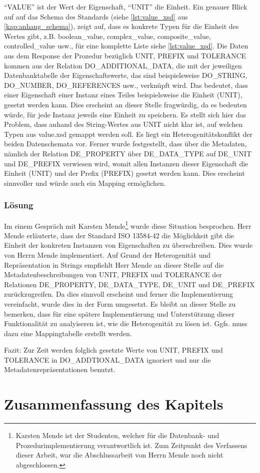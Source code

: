 \enquote{VALUE} ist der Wert der Eigenschaft, \enquote{UNIT} die Einheit. Ein genauer Blick auf auf das Schema des Standards (siehe \autoref{lst:value_xsd} aus \autoref{kap:anhang_schema}), zeigt auf, dass es konkrete Typen für die Einheit des Wertes gibt, z.B. boolean\_value, complex\_value, composite\_value, controlled\_value usw., für eine komplette Liste siehe \autoref{lst:value_xsd}. 
Die Daten aus dem Response der Prozedur bezüglich UNIT, PREFIX und TOLERANCE kommen aus der Relation DO\_ADDITIONAL\_DATA, die mit der jeweiligen Datenbanktabelle der Eigenschaftswerte, das sind beispielsweise DO\_STRING, DO\_NUMBER, DO\_REFERENCES usw., verknüpft wird. Das bedeutet, dass einer Eigenschaft einer Instanz eines Teiles beispielsweise die Einheit (UNIT), gesetzt werden kann. Dies erscheint an dieser Stelle fragwürdig, da es bedeuten würde, für jede Instanz jeweils eine Einheit zu speichern. 
Es stellt sich hier das Problem, dass anhand des String-Wertes aus UNIT nicht klar ist, auf welchen Typen aus value.xsd gemappt werden soll. Es liegt ein Heterogenitätskonflikt der beiden Datenschemata vor.  
Ferner wurde festgestellt, dass über die Metadaten, nämlich der Relation DE\_PROPERTY über DE\_DATA\_TYPE auf DE\_UNIT und DE\_PREFIX verwiesen wird, womit allen Instanzen dieser Eigenschaft die Einheit (UNIT) und der Prefix (PREFIX) gesetzt werden kann. Dies erscheint sinnvoller und würde auch ein Mapping ermöglichen. 

\subsubsection{Lösung}

Im einem Gespräch mit Karsten Mende\footnote{Karsten Mende ist der Studenten, welcher für die Datenbank- und Prozedurimplementierung verantwortlich ist. Zum Zeitpunkt des Verfassens dieser Arbeit, war die Abschlussarbeit von Herrn Mende noch nicht abgeschlossen.} wurde diese Situation besprochen. Herr Mende erläuterte, dass der Standard ISO 13584-42 \citep[vgl.][]{iso13584-42} die Möglichkeit gibt die Einheit der konkreten Instanzen von Eigenschaften zu überschreiben. Dies wurde von Herrn Mende implementiert. Auf Grund der Heterogenität und Repräsentation in Strings empfiehlt Herr Mende an dieser Stelle auf die Metadatenbeschreibungen von UNIT, PREFIX und TOLERANCE der Relationen DE\_PROPERTY, DE\_DATA\_TYPE, DE\_UNIT und DE\_PREFIX zurückzugreifen. 
Da dies sinnvoll erscheint und ferner die Implementierung vereinfacht, wurde dies in der Form umgesetzt. Es bleibt an dieser Stelle zu bemerken, dass für eine spätere Implementierung und Unterstützung dieser Funktionalität zu analyiseren ist, wie die Heterogenität zu lösen ist. Ggfs. muss dazu eine Mappingtabelle erstellt werden.

Fazit:
Zur Zeit werden folglich gesetzte Werte von UNIT, PREFIX und TOLERANCE in DO\_ADDTIONAL\_DATA ignoriert und nur die Metadatenrepräsentationen benutzt.  


\section{Zusammenfassung des Kapitels}



